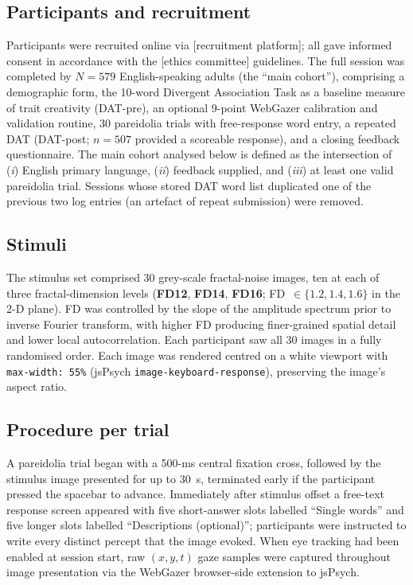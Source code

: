 \documentclass[11pt]{article}
\begin{document}
\subsection{Participants and recruitment}
Participants were recruited online via [recruitment platform]; all gave
informed consent in accordance with the [ethics committee] guidelines.
The full session was completed by $N = 579$ English-speaking adults
(the ``main cohort''), comprising a demographic form, the 10-word
Divergent Association Task \citep{Olson2021dat} as a baseline measure
of trait creativity (DAT-pre), an optional 9-point WebGazer calibration
and validation routine, 30 pareidolia trials with free-response word
entry, a repeated DAT (DAT-post; $n = 507$ provided a scoreable
response), and a closing feedback questionnaire. The main cohort
analysed below is defined as the intersection of (\emph{i}) English
primary language, (\emph{ii}) feedback supplied, and (\emph{iii}) at
least one valid pareidolia trial. Sessions whose stored DAT word list
duplicated one of the previous two log entries (an artefact of repeat
submission) were removed.

\subsection{Stimuli}
The stimulus set comprised 30 grey-scale fractal-noise images, ten at
each of three fractal-dimension levels (\textbf{FD12}, \textbf{FD14},
\textbf{FD16}; FD~$\in \{1.2, 1.4, 1.6\}$ in the 2-D plane). FD was
controlled by the slope of the amplitude spectrum prior to inverse
Fourier transform, with higher FD producing finer-grained spatial
detail and lower local autocorrelation. Each participant saw all 30
images in a fully randomised order. Each image was rendered centred on
a white viewport with \texttt{max-width: 55\%} (jsPsych
\texttt{image-keyboard-response}), preserving the image's aspect ratio.

\subsection{Procedure per trial}
A pareidolia trial began with a 500-ms central fixation cross, followed
by the stimulus image presented for up to 30~s, terminated early if the
participant pressed the spacebar to advance. Immediately after stimulus
offset a free-text response screen appeared with five short-answer
slots labelled ``Single words'' and five longer slots labelled
``Descriptions (optional)''; participants were instructed to write
every distinct percept that the image evoked. When eye tracking had
been enabled at session start, raw $(x, y, t)$ gaze samples were
captured throughout image presentation via the WebGazer browser-side
extension to jsPsych.
\end{document}
